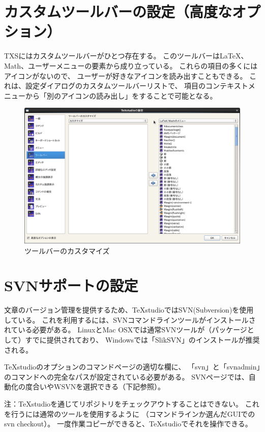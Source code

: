 \section{カスタムツールバーの設定（高度なオプション）}

TXSにはカスタムツールバーがひとつ存在する。
このツールバーはLaTeX、Math、ユーザーメニューの要素から成り立っている。
これらの項目の多くにはアイコンがないので、
ユーザーが好きなアイコンを読み出すこともできる。
これは、設定ダイアログのカスタムツールバーリストで、
項目のコンテキストメニューから「別のアイコンの読み出し」をすることで可能となる。

\begin{figure}[H]
  \centering
  \includegraphics[width=.8\linewidth]{configure_customToolbar.png}
  \caption{ツールバーのカスタマイズ}
\end{figure}

\section{SVNサポートの設定}\label{sec:config_svn}

文章のバージョン管理を提供するため、TeXstudioではSVN(Subversion)を使用している。
これを利用するには、SVNコマンドラインツールがインストールされている必要がある。
LinuxとMac OSXでは通常SVNツールが（パッケージとして）すでに提供されており、
Windowsでは「SlikSVN」のインストールが推奨される。

TeXstudioのオプションのコマンドページの適切な欄に、
「svn」と「svnadmin」のコマンドへの完全なパスが設定されている必要がある。
SVNページでは、自動化の度合いやWSVNを選択できる（下記参照）。

注：TeXstudioを通じてリポジトリをチェックアウトすることはできない。
これを行うには通常のツールを使用するように
（コマンドラインか選んだGUIでのsvn checkout）。
一度作業コピーができると、TeXstudioでそれを操作できる。

